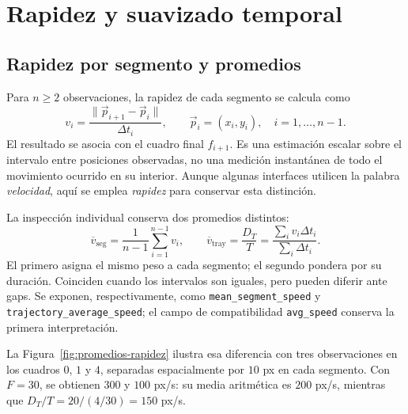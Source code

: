 \section{Rapidez y suavizado temporal}

\subsection{Rapidez por segmento y promedios}

Para $n\geq2$ observaciones, la rapidez de cada segmento se calcula como
\begin{equation}
  v_i=\frac{\lVert\vec{p}_{i+1}-\vec{p}_i\rVert}{\Delta t_i},
  \qquad \vec{p}_i=(x_i,y_i),\quad i=1,\ldots,n-1.
  \label{eq:rapidez-segmento-implementada}
\end{equation}
El resultado se asocia con el cuadro final $f_{i+1}$. Es una estimación escalar sobre el intervalo entre posiciones observadas, no una medición instantánea de todo el movimiento ocurrido en su interior. Aunque algunas interfaces utilicen la palabra \emph{velocidad}, aquí se emplea \emph{rapidez} para conservar esta distinción.

La inspección individual conserva dos promedios distintos:
\begin{equation}
  \overline{v}_{\mathrm{seg}}=\frac{1}{n-1}\sum_{i=1}^{n-1}v_i,
  \qquad
  \overline{v}_{\mathrm{tray}}=\frac{D_T}{T}
  =\frac{\sum_i v_i\Delta t_i}{\sum_i\Delta t_i}.
  \label{eq:promedios-rapidez}
\end{equation}
El primero asigna el mismo peso a cada segmento; el segundo pondera por su duración. Coinciden cuando los intervalos son iguales, pero pueden diferir ante gaps. Se exponen, respectivamente, como \texttt{mean\_segment\_speed} y \texttt{trajectory\_average\_speed}; el campo de compatibilidad \texttt{avg\_speed} conserva la primera interpretación.

La Figura~\ref{fig:promedios-rapidez} ilustra esa diferencia con tres observaciones en los cuadros $0$, $1$ y $4$, separadas espacialmente por $10$ px en cada segmento. Con $F=30$, se obtienen $300$ y $100$ px/s: su media aritmética es $200$ px/s, mientras que $D_T/T=20/(4/30)=150$ px/s.

